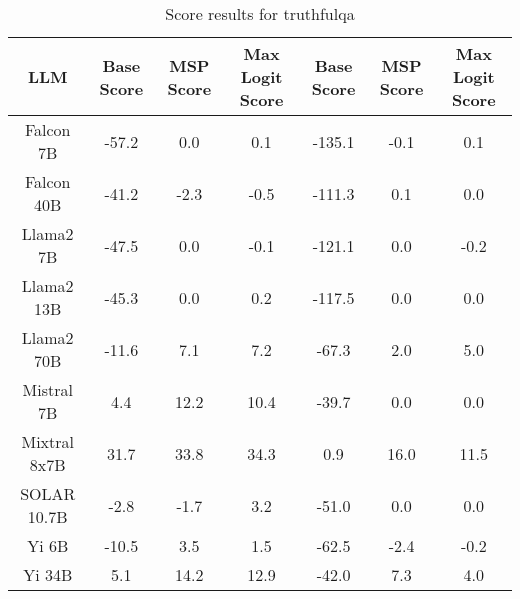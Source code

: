 \renewcommand\arraystretch{1.2}
\begin{table*}
\centering
\begin{tabular}{c|c|c|c|c|c|c}
LLM & Base Score & MSP Score & Max Logit Score & Base Score & MSP Score & Max Logit Score\\ \hline
Falcon 7B & -57.2 & 0.0 & 0.1 & -135.1 & -0.1 & 0.1\\
Falcon 40B & -41.2 & -2.3 & -0.5 & -111.3 & 0.1 & 0.0\\
Llama2 7B & -47.5 & 0.0 & -0.1 & -121.1 & 0.0 & -0.2\\
Llama2 13B & -45.3 & 0.0 & 0.2 & -117.5 & 0.0 & 0.0\\
Llama2 70B & -11.6 & 7.1 & 7.2 & -67.3 & 2.0 & 5.0\\
Mistral 7B & 4.4 & 12.2 & 10.4 & -39.7 & 0.0 & 0.0\\
Mixtral 8x7B & 31.7 & 33.8 & 34.3 & 0.9 & 16.0 & 11.5\\
SOLAR 10.7B & -2.8 & -1.7 & 3.2 & -51.0 & 0.0 & 0.0\\
Yi 6B & -10.5 & 3.5 & 1.5 & -62.5 & -2.4 & -0.2\\
Yi 34B & 5.1 & 14.2 & 12.9 & -42.0 & 7.3 & 4.0\\
\hline
\end{tabular}
\caption{Score results for truthfulqa}
\end{table*}
\label{tab:truthfulqa_score}
